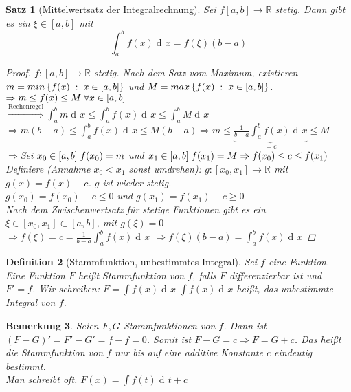 \documentclass[a4paper,titlepage,oneside]{article}
\def\R{\ensuremath{\mathbb{R}} }
\newcommand{\der}{\operatorname{d\!}{}}
\newcommand{\dx}{\der x}
\def\sp{\hspace{0,1cm}}
\newcommand{\menge}[2]{\ensuremath{\left\{#1\sp : \sp #2\right\}}}
\newcommand{\integral}[4][x]{\ensuremath{\int_{#2}^{#3}{#4\der #1}}}
\newcommand{\intAB}[2][x]{\integral[#1]{a}{b}{#2}}
\theoremstyle{thmstyle}
\newtheorem{satz}{Satz}[section]
\newtheorem{defi}[satz]{Definition}
\newtheorem{bem}[satz]{Bemerkung}
\theoremstyle{subthmstyle}
\begin{document}
\begin{satz}[Mittelwertsatz der Integralrechnung]
Sei $f [a,b] \to \R$ stetig. Dann gibt es ein $\xi \in [a,b]$ mit \[\intAB{f(x)} = f(\xi)(b-a)\]
\begin{proof}
$f: [a,b] \to \R$ stetig. Nach dem Satz vom Maximum, existieren $m = min\menge{f(x)}{x \in [a,b]}$ und $M = max\menge{f(x)}{x \in [a,b]}$.\\
$\Rightarrow m \le f(x) \le M \sp \forall x \in [a,b]$\\
$\displaystyle  \overset{\text{Rechenregel}}{\Rightarrow } \intAB{m} \le \intAB{f(x)} \le \intAB{M}$\\
$\displaystyle  \Rightarrow m(b-a) \le \intAB{f(x)} \le M(b-a) \Rightarrow m \le \underbrace{\frac{1}{b-a}\intAB{f(x)}}_{= c} \le M$\\
$\Rightarrow $Sei $ x_0 \in [a,b] \sp f(x_0) = m$ und $x_1 \in [a,b] \sp f(x_1) = M \Rightarrow f(x_0) \le c \le f(x_1)$\\
Definiere (Annahme $x_0 < x_1$ sonst umdrehen): $g: [x_0,x_1] \to \R$ mit $g(x) = f(x) - c$. $g$ ist wieder stetig.\\
$g(x_0) = f(x_0) -c  \le 0$ und $g(x_1) = f(x_1) - c \ge 0$\\
Nach dem Zwischenwertsatz für stetige Funktionen gibt es ein $\xi \in  [x_0,x_1] \subset [a,b]$, mit $g(\xi) = 0$\\
$\displaystyle \Rightarrow f(\xi) = c = \frac{1}{b-a}\intAB{f(x)}$
$\displaystyle \Rightarrow f(\xi)(b-a) = \intAB{f(x)}$
\end{proof}
\end{satz}

\begin{defi}[Stammfunktion, unbestimmtes Integral]
Sei $f$ eine Funktion. Eine Funktion $F$ heißt Stammfunktion von $f$, falls $F$ differenzierbar ist und $F' = f$.
Wir schreiben: $\displaystyle F = \int{f(x)\dx}$
$\int{f(x)\dx}$ heißt, das unbestimmte Integral von $f$.
\end{defi}

\begin{bem}
Seien $F,G$ Stammfunktionen von $f$. Dann ist $(F-G)' = F' - G' = f - f = 0$. Somit ist $F-G = c \Rightarrow F = G + c$. Das heißt die Stammfunktion von $f$ nur bis auf eine additive Konstante $c$ eindeutig bestimmt.\\
Man schreibt oft. $F(x) = \int{f(t)\der t} + c$
\end{bem}
\end{document}
